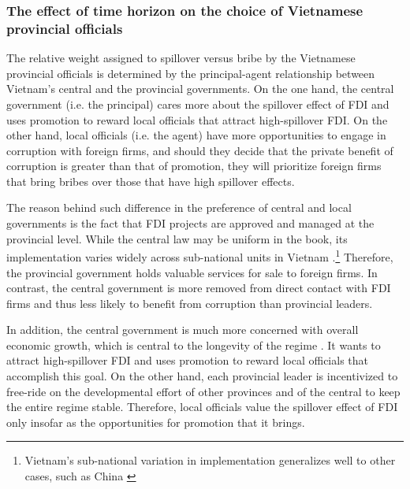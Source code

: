 \subsubsection{The effect of time horizon on the choice of Vietnamese provincial officials} 

The relative weight assigned to spillover versus bribe by the Vietnamese provincial officials is determined by the principal-agent relationship between Vietnam's central and the provincial governments. On the one hand, the central government (i.e. the principal) cares more about the spillover effect of FDI and uses promotion to reward local officials that attract high-spillover FDI. On the other hand, local officials (i.e. the agent) have more opportunities to engage in corruption with foreign firms, and should they decide that the private benefit of corruption is greater than that of promotion, they will prioritize foreign firms that bring bribes over those that have high spillover effects.

The reason behind such difference in the preference of central and local governments is the fact that FDI projects are approved and managed at the provincial level. While the central law may be uniform in the book, its implementation varies widely across sub-national units in Vietnam \citep{Meyer2005}.\footnote{Vietnam's sub-national variation in implementation generalizes well to other cases, such as China \citep{Thun2006}} Therefore, the provincial government holds valuable services for sale to foreign firms. In contrast, the central government is more removed from direct contact with FDI firms and thus less likely to benefit from corruption than provincial leaders. 

In addition, the central government is much more concerned with overall economic growth, which is central to the longevity of the regime \citep{Malesky2008}. It wants to attract high-spillover FDI and uses promotion to reward local officials that accomplish this goal. On the other hand, each provincial leader is incentivized to free-ride on the developmental effort of other provinces and of the central to keep the entire regime stable. Therefore, local officials value the spillover effect of FDI only insofar as the opportunities for promotion that it brings.

